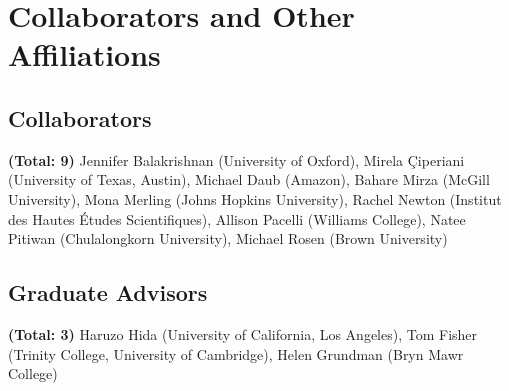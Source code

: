 \documentclass[12pt]{amsart}
\begin{document}
\section*{Collaborators and Other Affiliations}
\subsection*{Collaborators} \textbf{(Total: 9)} Jennifer Balakrishnan (University of Oxford), Mirela \c{C}iperiani (University of Texas, Austin), Michael Daub (Amazon), Bahare Mirza (McGill University), Mona Merling (Johns Hopkins University), Rachel Newton (Institut des Hautes \'Etudes Scientifiques), Allison Pacelli (Williams College), Natee Pitiwan (Chulalongkorn University), Michael Rosen (Brown University)

\subsection*{Graduate Advisors} \textbf{(Total: 3)}
Haruzo Hida (University of California, Los Angeles), Tom Fisher (Trinity College, University of Cambridge), Helen Grundman (Bryn Mawr College)
\end{document}
